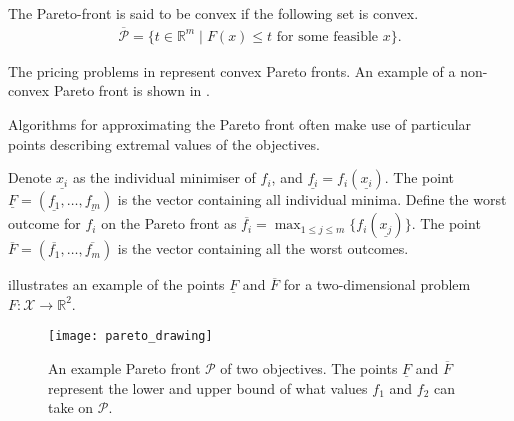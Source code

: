 \documentclass[main.tex]{subfiles}
\begin{document}
\begin{example}
\begin{figure}[htbp]
  \end{figure}
\end{example}

\begin{mydef}[Convexity]
  The Pareto-front is said to be convex if the following set is convex.
  \begin{align}
    \overline{\mathcal{P}} = \{t\in\mathbb{R}^m\mid F(x)\leq t \text{ for
    some feasible } x\}.
  \end{align}
\end{mydef}

\begin{example}[Convexity]
  The pricing problems in  represent convex Pareto
  fronts.
  An example of a non-convex Pareto front is shown in
  .
\end{example}

Algorithms for approximating the Pareto front
often make use of particular points describing extremal
values of the objectives.
\begin{mydef}
  Denote $\underline{x_i}$ as the individual minimiser of $f_i$, and
  $\underline{f_i}=f_i(\underline {x_i})$.
  The point $\underline{F}=(\underline{f_1},\dots,\underline{f_m})$
  is the vector containing all individual minima.
  Define the worst outcome for $f_i$ on the Pareto front as
  $\overline{f_i}=\max_{1\leq j\leq m}\{f_i(\underline{x_j})\}$.
  The point  $\overline{F} =
  (\overline{f_1}, \dots, \overline{f_m})$ is the vector containing
  all the worst outcomes.
\end{mydef}

\begin{example}
   illustrates an example of the points
  $\underline{F}$ and $\overline{F}$ %
  for a two-dimensional problem $F:\mathcal{X}\to\mathbb{R}^2$.
  \begin{figure}[htbp]
    \centering
    \texttt{[image: pareto\_drawing]}
    \caption[An example Pareto front for two objectives.]{An example Pareto front $\mathcal{P}$ of two
      objectives. The points $\underline{F}$ and $\overline{F}$
      represent the
      lower and upper bound of what values
      $f_1$ and $f_2$ can take on $\mathcal{P}$.}\label{fig:pareto_drawing}
  \end{figure}
\end{example}
\end{document}
